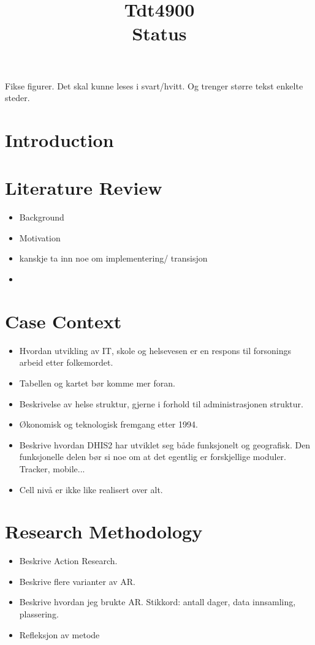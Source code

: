 \documentclass{article}
\title{Tdt4900 \\ Status}
\begin{document}
Fikse figurer. Det skal kunne leses i svart/hvitt. Og trenger større tekst enkelte steder.

\section{Introduction}

\section{Literature Review}
\begin{itemize}
\item Background
\item Motivation
\item  kanskje ta inn noe om implementering/ transisjon
\item 
\end{itemize}
\section{Case Context}
\begin{itemize}
\item Hvordan utvikling av IT, skole og helsevesen er en respons til forsonings arbeid etter folkemordet.
\item Tabellen og kartet bør komme mer foran.
\item Beskrivelse av helse struktur, gjerne i forhold til administrasjonen struktur.
\item Økonomisk og teknologisk fremgang etter 1994.
\item Beskrive hvordan DHIS2 har utviklet seg både funksjonelt og geografisk. Den funksjonelle delen bør si noe om at det egentlig er forskjellige moduler. Tracker, mobile...
\item Cell nivå er ikke like realisert over alt.
\end{itemize}
\section{Research Methodology}
\begin{itemize}
\item Beskrive Action Research.
\item Beskrive flere varianter av AR.
\item Beskrive hvordan jeg brukte AR. Stikkord: antall dager, data innsamling, plassering.
\item Refleksjon av metode 
\end{itemize}
\end{document}
